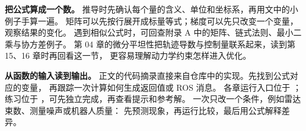 \documentclass[UTF8,fontset=none,a4paper,zihao=5,oneside,openany]{ctexbook}
\begin{document}
\textbf{把公式算成一个数。}
推导时先确认每个量的含义、单位和坐标系，再用文中的小例子手算一遍。
矩阵可以先按行展开成标量等式；梯度可以先只改变一个变量，观察结果的变化。
遇到相似公式时，可回查附录 A 中的矩阵、链式法则、最小二乘与协方差例子。
第 04 章的微分平坦性把轨迹导数与控制量联系起来，读到第 15、16 章时再回看这一节，
更容易理解动力学约束怎样进入优化。

\textbf{从函数的输入读到输出。}
正文的代码摘录直接来自仓库中的实现。先找到公式对应的变量，
再跟踪一次计算如何生成返回值或 ROS 消息。
各章运行入口位于 ；
练习位于 ，可先独立完成，再查看提示和参考解。
一次只改一个条件，例如雷达束数、测量噪声或机器人质量：
先预测现象，再运行比较，最后用公式解释差异。

\setcounter{tocdepth}{1}
{\makeatletter
\renewcommand{\@pnumwidth}{2.3em}
\renewcommand{\@tocrmarg}{3.3em}
\makeatother
\linespread{1.18}\selectfont\tableofcontents}
\mainmatter




















\appendix
{}




\end{document}
